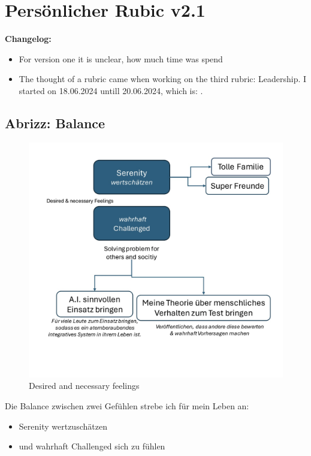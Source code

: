 
\chapter{Persönlicher Rubic v2.1}
\setcounter{section}{0}

\textbf{Changelog:}\\
\begin{itemize}
	\item For version one it is unclear, how much time was spend
	\item The thought of a rubric came when working on the third rubric: Leadership. I started on 18.06.2024 untill 20.06.2024, which is: .
\end{itemize}

\section{Abrizz: Balance}

\begin{figure}[H]
	\centering
	\includegraphics[scale = 0.2]{attachment/chapter_OWN/Scc009}
	\caption{Desired and necessary  feelings}
\end{figure}

Die Balance zwischen zwei Gefühlen strebe ich für mein Leben an:
\begin{itemize}
    \item Serenity wertzuschätzen 
    \item und wahrhaft Challenged  sich zu fühlen
\end{itemize}

